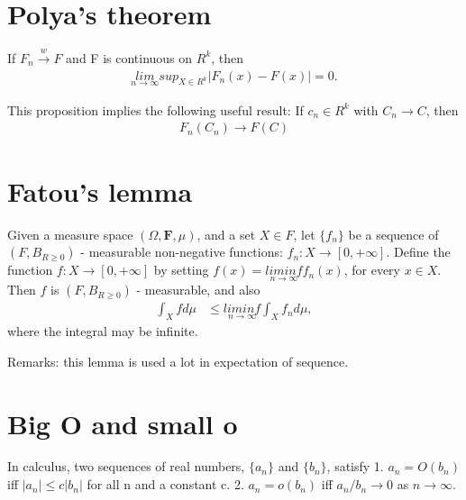 \documentclass[11pt]{article} %
\begin{document}
\section{Polya's theorem}

If $F_n \xrightarrow {w} F$ and F is continuous on $R^{k}$, then
 \begin{align*}
	\underset{n \rightarrow \infty}{lim}  sup_{X \in R^k} |F_n(x) - F(x)| = 0.
\end{align*}

This proposition implies the following useful result:
If $c_n \in R^{k}$ with $C_n \rightarrow C$, then
 \begin{align*}
   F_n(C_n) \rightarrow F(C)
\end{align*}

\section{Fatou's lemma}

Given a measure space $(\Omega, \mathbf{F}, \mu)$, and a set $X \in F$, let $\{f_n \}$ be a sequence of $(F, B_{R \geq 0})$ - measurable non-negative functions:
$f_n: X \rightarrow [0, + \infty]$. Define the function $f: X \rightarrow [0, + \infty]$ by setting $f(x) = \underset{n \rightarrow \infty}{lim inf} f_n(x)$, for every $x \in X$.
Then $f$ is $(F, B_{R \geq 0})$ - measurable, and also 
 \begin{align*}
   \int_X f d\mu & \leq \underset{n \rightarrow \infty}{lim inf} \int_X f_n d\mu, 
\end{align*}
where the integral may be infinite.

Remarks: this lemma is used a lot in expectation of sequence.
\section{Big O and small o}
In calculus, two sequences of real numbers, $\{ a_n\}$ and $\{b_n\}$, satisfy 
1. $a_n = O(b_n)$ iff $|a_n| \leq c|b_n|$ for all n and a constant c.
2. $a_n = o(b_n)$ iff $a_n/b_n \rightarrow 0$ as $n \rightarrow \infty$.
\end{document}
